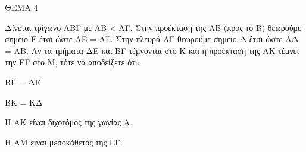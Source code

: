 
ΘΕΜΑ 4

Δίνεται τρίγωνο ΑΒΓ με ΑΒ \textless{} ΑΓ. Στην προέκταση της ΑΒ (προς το Β) θεωρούμε σημείο Ε έτσι ώστε ΑΕ = ΑΓ. Στην πλευρά ΑΓ θεωρούμε σημείο Δ έτσι ώστε ΑΔ = ΑΒ. Αν τα τμήματα ΔΕ και ΒΓ τέμνονται στο Κ και η προέκταση της ΑΚ τέμνει την ΕΓ στο Μ, τότε να αποδείξετε ότι:

\begin{alist}
\item ΒΓ = ΔΕ 

\item ΒΚ = ΚΔ 

\item Η ΑΚ είναι διχοτόμος της γωνίας Α. 

\item Η ΑΜ είναι μεσοκάθετος της ΕΓ. 


\end{alist}
